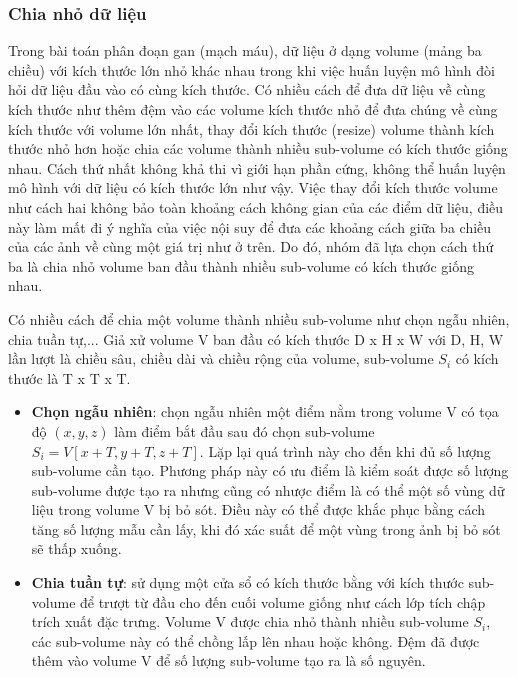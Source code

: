 \subsubsection{Chia nhỏ dữ liệu}
Trong bài toán phân đoạn gan (mạch máu), dữ liệu ở dạng volume (mảng ba chiều) với kích thước lớn nhỏ khác nhau trong khi việc huấn luyện mô hình đòi hỏi dữ liệu đầu vào có cùng kích thước. Có nhiều cách để đưa dữ liệu về cùng kích thước như thêm đệm vào các volume kích thước nhỏ để đưa chúng về cùng kích thước với volume lớn nhất, thay đổi kích thước (resize) volume thành kích thước nhỏ hơn hoặc chia các volume thành nhiều sub-volume có kích thước giống nhau. Cách thứ nhất không khả thi vì giới hạn phần cứng, không thể huấn luyện mô hình với dữ liệu có kích thước lớn như vậy. Việc thay đổi kích thước volume như cách hai không bảo toàn khoảng cách không gian của các điểm dữ liệu, điều này làm mất đi ý nghĩa của việc nội suy để đưa các khoảng cách giữa ba chiều của các ảnh về cùng một giá trị như ở trên. Do đó, nhóm đã lựa chọn cách thứ ba là chia nhỏ volume ban đầu thành nhiều sub-volume có kích thước giống nhau.\par
Có nhiều cách để chia một volume thành nhiều sub-volume như chọn ngẫu nhiên, chia tuần tự,... Giả xử volume V ban đầu có kích thước D x H x W với D, H, W lần lượt là chiều sâu, chiều dài và chiều rộng của volume, sub-volume $S_{i}$ có kích thước là T x T x T.\par
\begin{itemize}
    \item \textbf{Chọn ngẫu nhiên}: chọn ngẫu nhiên một điểm nằm trong volume V có tọa độ $(x, y, z)$ làm điểm bắt đầu sau đó chọn sub-volume $S_{i} = V[x+T, y+T, z+T]$. Lặp lại quá trình này cho đến khi đủ số lượng sub-volume cần tạo. Phương pháp này có ưu điểm là kiểm soát được số lượng sub-volume được tạo ra nhưng cũng có nhược điểm là có thể một số vùng dữ liệu trong volume V bị bỏ sót. Điều này có thể được khắc phục bằng cách tăng số lượng mẫu cần lấy, khi đó xác suất để một vùng trong ảnh bị bỏ sót sẽ thấp xuống.
    \item \textbf{Chia tuần tự}: sử dụng một cửa sổ có kích thước bằng với kích thước sub-volume để trượt từ đầu cho đến cuối volume giống như cách lớp tích chập trích xuất đặc trưng. Volume V được chia nhỏ thành nhiều sub-volume $S_{i}$, các sub-volume này có thể chồng lấp lên nhau hoặc không. Đệm đã được thêm vào volume V để số lượng sub-volume tạo ra là số nguyên.
\end{itemize}

